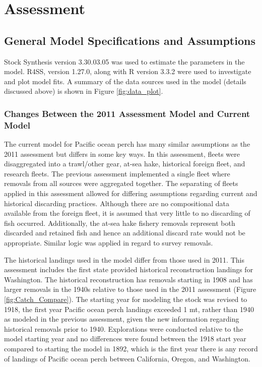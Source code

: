 \documentclass[12pt,]{article}
\begin{document}
\section{Assessment}\label{assessment}

\subsection{General Model Specifications and
Assumptions}\label{general-model-specifications-and-assumptions}

Stock Synthesis version 3.30.03.05 was used to estimate the parameters
in the model. R4SS, version 1.27.0, along with R version 3.3.2 were used
to investigate and plot model fits. A summary of the data sources used
in the model (details discussed above) is shown in Figure
\ref{fig:data_plot}.

\subsubsection{Changes Between the 2011 Assessment Model and Current
Model}\label{changes-between-the-2011-assessment-model-and-current-model}

The current model for Pacific ocean perch has many similar assumptions
as the 2011 assessment but differs in some key ways. In this assessment,
fleets were disaggregated into a trawl/other gear, at-sea hake,
historical foreign fleet, and research fleets. The previous assessment
implemented a single fleet where removals from all sources were
aggregated together. The separating of fleets applied in this assessment
allowed for differing assumptions regarding current and historical
discarding practices. Although there are no compositional data available
from the foreign fleet, it is assumed that very little to no discarding
of fish occurred. Additionally, the at-sea hake fishery removals
represent both discarded and retained fish and hence an additional
discard rate would not be appropriate. Similar logic was applied in
regard to survey removals.

The historical landings used in the model differ from those used in
2011. This assessment includes the first state provided historical
reconstruction landings for Washington. The historical reconstruction
has removals starting in 1908 and has larger removals in the 1940s
relative to those used in the 2011 assessment (Figure
\ref{fig:Catch_Compare}). The starting year for modeling the stock was
revised to 1918, the first year Pacific ocean perch landings exceeded 1
mt, rather than 1940 as modeled in the previous assessment, given the
new information regarding historical removals prior to 1940.
Explorations were conducted relative to the model starting year and no
differences were found between the 1918 start year compared to starting
the model in 1892, which is the first year there is any record of
landings of Pacific ocean perch between California, Oregon, and
Washington.
\end{document}
